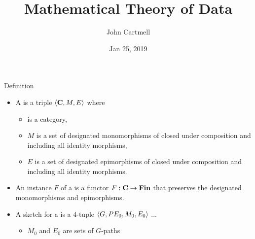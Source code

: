 \documentclass[xcolor=pst,dvips]{beamer}   %
\title[John Cartmell]{Mathematical Theory of Data}
\author{John Cartmell}
\institute{ad otium}
\date{Jan 25, 2019}
\begin{document}
\begin{frame}
\titlepage
\end{frame}

\section{\MToDsection}
\subsection{\MToDsubsectionCategorieswithEpiMonos}
\iffalse %
\begin{frame}{Definition}
A \term{category with epi-mono splits} is a category such that for all $f:x \morph y$
in \catcw there exists an object $img(f)$, an epimorphism $f_e:x \morph img(f)$
and a monomorphism $f_m:img(f) \morph y$ such that
\scalebox{0.9}{\roomup{1.3cm}\epimonosplitdiagram{x}{y}{f}}
commutes. 

An \term{instance} of a category with epi-mono splits \catcw is a functor from 
\catcw to the category $\Fin$ of finite sets and functions that preserves epimorphims and monomorphisms.
\end{frame}
\fi


\begin{frame}{Definition}
\begin{itemize}
\item A \term{\catMEterm} is a triple $\langle\textbf{C},M,E\rangle$ where 
\begin{itemize}
\item \catcw is a category,
\item $M$ is a set of designated monomorphisms of \catc closed under composition and including all identity morphisms,
\item $E$ is a set of designated epimorphisms of \catc closed under composition and including all identity morphisms.
\end{itemize}
\item An instance $F$ of a \catMEterm is a functor $F: \textbf{C} \rightarrow \textbf{Fin}$ 
that preserves the designated monomorphisms and epimorphisms.


\item A sketch for a \catMEterm is a 4-tuple $\langle G,PE_0,M_0,E_0\rangle$ ...
\begin{itemize}
 \item   $M_0$ and $E_0$ are sets of $G$-paths  
\end{itemize}
\end{itemize}
\end{frame}
\end{document}
